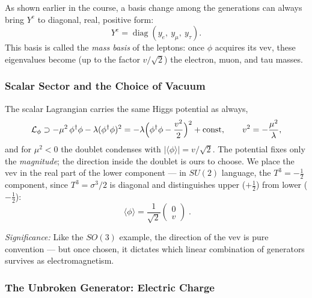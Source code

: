 As shown earlier in the course, a basis change among the generations can always bring $Y^e$ to diagonal, real, positive form:
\begin{equation}
  Y^e=\operatorname{diag}(y_e,\ y_\mu,\ y_\tau) .
  \label{eq:lec17:mass_basis}
\end{equation}
This basis is called the \emph{mass basis} of the leptons: once $\phi$ acquires its vev, these eigenvalues become (up to the factor $v/\sqrt2$) the electron, muon, and tau masses.

\subsubsection*{Scalar Sector and the Choice of Vacuum}

The scalar Lagrangian carries the same Higgs potential as always,
\begin{equation}
  \mathcal{L}_\phi\supset
  -\mu^2\,\phi^\dagger\phi-\lambda(\phi^\dagger\phi)^2
  =-\lambda\Big(\phi^\dagger\phi-\frac{v^2}{2}\Big)^2+\text{const},
  \qquad
  v^2=-\frac{\mu^2}{\lambda} ,
  \label{eq:lec17:lsm_potential}
\end{equation}
and for $\mu^2<0$ the doublet condenses with $|\langle\phi\rangle|=v/\sqrt2$. The potential fixes only the \emph{magnitude}; the direction inside the doublet is ours to choose. We place the vev in the real part of the lower component --- in $SU(2)$ language, the $T^3=-\tfrac12$ component, since $T^3=\sigma^3/2$ is diagonal and distinguishes upper ($+\tfrac12$) from lower ($-\tfrac12$):
\begin{equation}
  \boxed{\;\langle\phi\rangle=\frac{1}{\sqrt2}\begin{pmatrix}0\\ v\end{pmatrix}\;.}
  \label{eq:lec17:lsm_vev}
\end{equation}

\textit{Significance:} Like the $SO(3)$ example, the direction of the vev is pure convention --- but once chosen, it dictates which linear combination of generators survives as electromagnetism.

\subsubsection*{The Unbroken Generator: Electric Charge}

